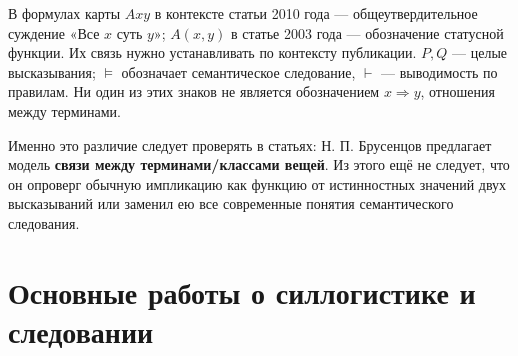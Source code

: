 \documentclass[12pt,a4paper]{article}
\begin{document}
В формулах карты \(Axy\) в контексте статьи 2010 года — общеутвердительное суждение «Все \(x\) суть \(y\)»; \(A(x,y)\) в статье 2003 года — обозначение статусной функции. Их связь нужно устанавливать по контексту публикации. \(P,Q\) — целые высказывания; \(\models\) обозначает семантическое следование, \(\vdash\) — выводимость по правилам. Ни один из этих знаков не является обозначением \(x\Rightarrow y\), отношения между терминами.

Именно это различие следует проверять в статьях: Н. П. Брусенцов предлагает модель \textbf{связи между терминами/классами вещей}. Из этого ещё не следует, что он опроверг обычную импликацию как функцию от истинностных значений двух высказываний или заменил ею все современные понятия семантического следования.

\section{Основные работы о силлогистике и следовании}
\end{document}
